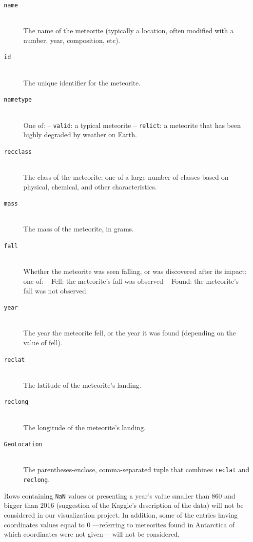 \documentclass[10pt,conference,compsocconf]{IEEEtran}
\begin{document}
\begin{description}
\item[\texttt{name}] \ \\
  The name of the meteorite (typically a location, often modified with a number, year, composition, etc).
\item[\texttt{id}] \ \\
  The unique identifier for the meteorite.
\item[\texttt{nametype}] \ \\
  One of: -- \texttt{valid}: a typical meteorite -- \texttt{relict}: a meteorite that has been highly degraded by weather on Earth.
\item[\texttt{recclass}] \ \\
  The class of the meteorite; one of a large number of classes based on physical, chemical, and other characteristics.
\item[\texttt{mass}] \ \\
  The mass of the meteorite, in grams.
\item[\texttt{fall}] \ \\
   Whether the meteorite was seen falling, or was discovered after its impact; one of: -- Fell: the meteorite's fall was observed -- Found: the meteorite's fall was not observed.
\item[\texttt{year}] \ \\
  The year the meteorite fell, or the year it was found (depending on the value of fell).
\item[\texttt{reclat}] \ \\
  The latitude of the meteorite's landing.
\item[\texttt{reclong}] \ \\
  The longitude of the meteorite's landing.
\item[\texttt{GeoLocation}] \ \\
  The parentheses-enclose, comma-separated tuple that combines \texttt{reclat} and \texttt{reclong}.
\end{description}

Rows containing \texttt{NaN} values or presenting a year’s value smaller than $860$ and bigger than $2016$ (suggestion of the Kaggle’s description of the data) will not be considered in our visualization project. In addition, some of the entries having coordinates values equal to $0$ ---referring to meteorites found in Antarctica of which coordinates were not given--- will not be considered. 

\end{document}
